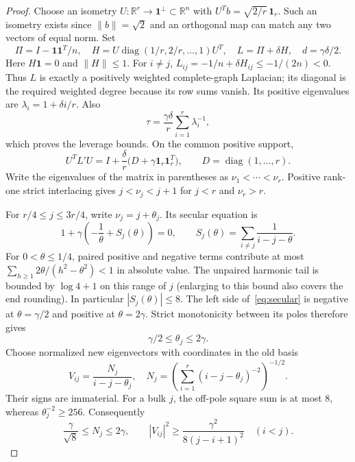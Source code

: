 \documentclass[11pt]{article}
\newcommand{\one}{\boldsymbol 1}
\newcommand{\R}{\mathbb R}
\begin{document}
\begin{proof}
Choose an isometry $U:\R^r\to\one^\perp\subset\R^n$ with
$U^Tb=\sqrt{2/r}\,\one_r$. Such an isometry exists since
$\|b\|=\sqrt2$ and an orthogonal map can match any two vectors of
equal norm. Set
\[
 \Pi=I-\one\one^T/n,\quad
 H=U\operatorname{diag}(1/r,2/r,\ldots,1)U^T,\quad
 L=\Pi+\delta H,\quad d=\gamma\delta/2.
\]
Here $H\one=0$ and $\|H\|\le1$. For $i\ne j$,
$L_{ij}=-1/n+\delta H_{ij}\le-1/(2n)<0$.
Thus $L$ is exactly a positively weighted complete-graph Laplacian;
its diagonal is the required weighted degree because its row sums vanish.
Its positive eigenvalues are $\lambda_i=1+\delta i/r$.
Also
\[
 \tau=\frac{\gamma\delta}{r}\sum_{i=1}^r\lambda_i^{-1},
\]
which proves the leverage bounds. On the common positive support,
\[
 U^TL'U=I+\frac\delta r\big(D+\gamma\one_r\one_r^T\big),
 \qquad D=\operatorname{diag}(1,\ldots,r).
\]
Write the eigenvalues of the matrix in parentheses as
$\nu_1<\cdots<\nu_r$. Positive rank-one strict interlacing gives
$j<\nu_j<j+1$ for $j<r$ and $\nu_r>r$.

For $r/4\le j\le3r/4$, write $\nu_j=j+\theta_j$.
Its secular equation is
\begin{equation}\label{eq:secular}
 1+\gamma\left(-\frac1\theta+S_j(\theta)\right)=0,
 \qquad S_j(\theta)=\sum_{i\ne j}\frac1{i-j-\theta}.
\end{equation}
For $0<\theta\le1/4$, paired positive and negative terms contribute
at most
$\sum_{h\ge1}2\theta/(h^2-\theta^2)<1$ in absolute value.
The unpaired harmonic tail is bounded by $\log4+1$ on this range of
$j$ (enlarging to this bound also covers the end rounding).
In particular $|S_j(\theta)|\le8$.
The left side of~\eqref{eq:secular} is negative at $\theta=\gamma/2$
and positive at $\theta=2\gamma$.
Strict monotonicity between its poles therefore gives
\begin{equation}\label{eq:bulk}
 \gamma/2\le\theta_j\le2\gamma.
\end{equation}
Choose normalized new eigenvectors with coordinates in the old basis
\[
 V_{ij}=\frac{N_j}{i-j-\theta_j},\quad
 N_j=\left(\sum_{i=1}^r(i-j-\theta_j)^{-2}\right)^{-1/2}.
\]
Their signs are immaterial. For a bulk $j$, the off-pole square sum is
at most $8$, whereas $\theta_j^{-2}\ge256$.
Consequently
\begin{equation}\label{eq:norms}
 \frac\gamma{\sqrt8}\le N_j\le2\gamma,
 \qquad |V_{ij}|^2\ge\frac{\gamma^2}{8(j-i+1)^2}\quad(i<j).
\end{equation}


\end{proof}
\end{document}
